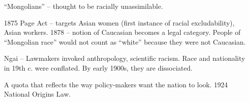 ``Mongolians'' -- thought to be racially unassimilable.

1875 Page Act -- targets Asian women (first instance of racial excludability), Asian workers.  1878 -- notion of Caucasian becomes a legal category. People of ``Mongolian race'' would not count as ``white'' because they were not Caucasian.

Ngai -- Lawmakers invoked anthropology, scientific racism. Race and nationality in 19th c. were conflated. By early 1900s, they are dissociated. 

A quota that reflects the way policy-makers want the nation to look. 1924 National Origins Law.

